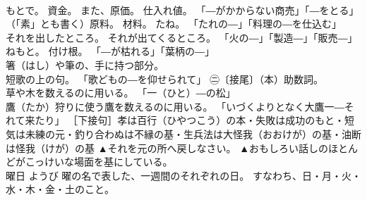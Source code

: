\documentclass[8pt]{extreport}
\begin{document}
\begin{CJK}{UTF8}{min}
\\	もとで。 資金。 また、原価。 仕入れ値。 「―がかからない商売」「―をとる」 
\\	（「素」とも書く）原料。 材料。 たね。 「たれの―」「料理の―を仕込む」 
\\	それを出したところ。 それが出てくるところ。 「火の―」「製造―」「販売―」 
\\	ねもと。 付け根。 「―が枯れる」「葉柄の―」 
\\	箸（はし）や筆の、手に持つ部分。 
\\	短歌の上の句。 「歌どもの―を仰せられて」 ㊁〔接尾〕（本）助数詞。 
\\	草や木を数えるのに用いる。 「一（ひと）―の松」 
\\	鷹（たか）狩りに使う鷹を数えるのに用いる。 「いづくよりとなく大鷹一―それて来たり」 ［下接句］孝は百行（ひやつこう）の本・失敗は成功のもと・短気は未練の元・釣り合わぬは不縁の基・生兵法は大怪我（おおけが）の基・油断は怪我（けが）の基	▲それを元の所へ戻しなさい。 ▲おもしろい話しのほとんどがこっけいな場面を基にしている。
\\	曜日	ようび	曜の名で表した、一週間のそれぞれの日。 すなわち、日・月・火・水・木・金・土のこと。	
\end{CJK}
\end{document}

